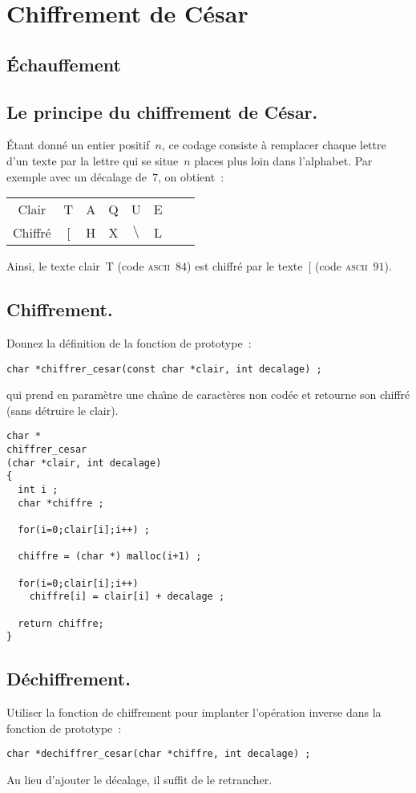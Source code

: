 \section{Chiffrement de C\'esar}
\subsection{\'Echauffement}

\subsection*{Le principe du chiffrement de C\'esar.}
\'Etant donn\'e un entier positif~$n$, ce codage consiste \`a
remplacer chaque lettre d'un texte par la lettre qui se situe~$n$
places plus loin dans l'alphabet. Par exemple avec un d\'ecalage
de~$7$, on obtient~:
\par
\begin{center}
\begin{tabular}{cccccccc}
Clair & T & A & Q & U & E \\
Chiffr\'e &  [ & H & X & $\setminus$ & L
\end{tabular}
\end{center}
Ainsi, le texte clair~T (code \textsc{ascii}~$84$) est chiffr\'e par
le texte~[ (code \textsc{ascii}~$91$).
\subsection{Chiffrement.}
Donnez la d\'efinition de la fonction de prototype~:
\begin{verbatim}
char *chiffrer_cesar(const char *clair, int decalage) ;
\end{verbatim}
qui prend en param\`etre une cha\^\i{}ne de caract\`eres non cod\'ee
et retourne son chiffr\'e (sans d\'etruire le clair).  
\ifcorrection
\begin{correction}
\begin{verbatim}
char *
chiffrer_cesar
(char *clair, int decalage) 
{
  int i ;
  char *chiffre ;

  for(i=0;clair[i];i++) ;

  chiffre = (char *) malloc(i+1) ;

  for(i=0;clair[i];i++) 
    chiffre[i] = clair[i] + decalage ;

  return chiffre;
}
\end{verbatim}
\end{correction}
\fi
\subsection{D\'echiffrement.}
Utiliser la fonction de chiffrement pour implanter l'op\'eration
inverse dans la fonction de prototype~:
\begin{verbatim}
char *dechiffrer_cesar(char *chiffre, int decalage) ;
\end{verbatim}
\ifcorrection
\begin{correction}
  Au lieu d'ajouter le d\'ecalage, il suffit de le retrancher.
\end{correction}
\fi
